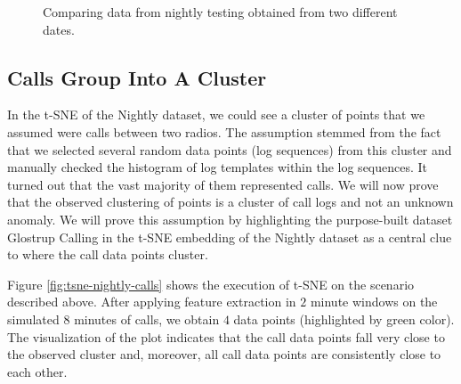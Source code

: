 \begin{figure}%
    \centering
    \qquad
    \caption{Comparing data from nightly testing obtained from two different dates.}%
    \label{fig:tsne-nights-comparison}%
\end{figure}


\subsection{Calls Group Into A Cluster}
\label{assumption-calls}
In the t-SNE of the Nightly dataset, we could see a cluster of points that we assumed were calls between two radios. The assumption stemmed from the fact that we selected several random data points (log sequences) from this cluster and manually checked the histogram of log templates within the log sequences. It turned out that the vast majority of them represented calls. We will now prove that the observed clustering of points is a cluster of call logs and not an unknown anomaly. We will prove this assumption by highlighting the purpose-built dataset Glostrup Calling in the t-SNE embedding of the Nightly dataset as a central clue to where the call data points cluster.

Figure \ref{fig:tsne-nightly-calls} shows the execution of t-SNE on the scenario described above. After applying feature extraction in $2$ minute windows on the simulated $8$ minutes of calls, we obtain $4$ data points (highlighted by green color). The visualization of the plot indicates that the call data points fall very close to the observed cluster and, moreover, all call data points are consistently close to each other. 


